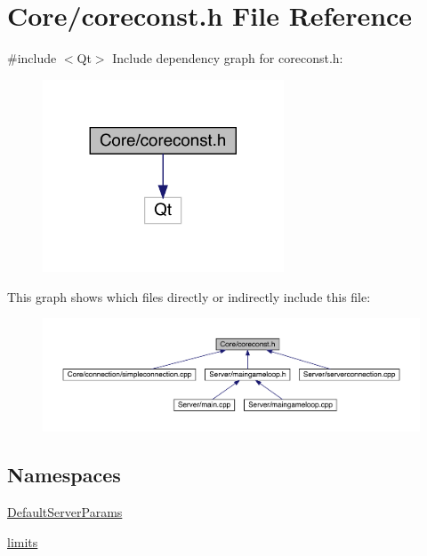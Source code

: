 \hypertarget{a00020}{}\section{Core/coreconst.h File Reference}
\label{a00020}
{\ttfamily \#include $<$Qt$>$}\newline
Include dependency graph for coreconst.\+h\+:
\nopagebreak
\begin{figure}[H]
\begin{center}
\leavevmode
\includegraphics[width=203pt]{de/d11/a00021}
\end{center}
\end{figure}
This graph shows which files directly or indirectly include this file\+:
\nopagebreak
\begin{figure}[H]
\begin{center}
\leavevmode
\includegraphics[width=350pt]{d7/de0/a00022}
\end{center}
\end{figure}
\subsection*{Namespaces}
\begin{DoxyCompactItemize}
\item 
 \hyperlink{a00114}{Default\+Server\+Params}
\item 
 \hyperlink{a00115}{limits}
\end{DoxyCompactItemize}
